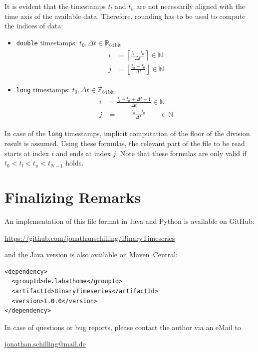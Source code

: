 \documentclass[a4paper,10pt]{article}
\begin{document}
It is evident that the timestamps $t_l$ and $t_u$ are not necessarily aligned with the time axis of the available data.
Therefore, rounding has to be used to compute the indices of data:
\begin{itemize}
  \item \texttt{double} timestamps: $t_0, \Delta t \in \mathbb{R}_\mathrm{64\,bit}$
  \begin{gather}
   \begin{align}
    i & = \left\lceil  \frac{t_l - t_0}{\Delta t} \right\rceil  \in \mathbb{N} \\
    j & = \left\lfloor \frac{t_u - t_0}{\Delta t} \right\rfloor \in \mathbb{N}
   \end{align}
  \end{gather}
  \item \texttt{long} timestamps: $t_0, \Delta t \in \mathbb{Z}_\mathrm{64\,bit}$
  \begin{gather}
   \begin{align}
    i & = \frac{t_l - t_0 + \Delta t - 1}{\Delta t} \in \mathbb{N} \\
    j & = \qquad \frac{t_u - t_0}{\Delta t} \qquad  \in \mathbb{N}
   \end{align}
  \end{gather}
\end{itemize}
In case of the \texttt{long} timestamps, implicit computation of the floor of the division result is assumed.
Using these formulas, the relevant part of the file to be read starts at index $i$ and ends at index $j$.
Note that these formulas are only valid if $t_0 < t_l < t_u < t_{N-1}$ holds.








\section{Finalizing Remarks}
An implementation of this file format in Java and Python is available on GitHub:
\begin{center}
\href{https://github.com/jonathanschilling/BinaryTimeseries}{https://github.com/jonathanschilling/BinaryTimeseries}
\end{center}
and the Java version is also available on Maven~Central:
\begin{verbatim}
<dependency>
  <groupId>de.labathome</groupId>
  <artifactId>BinaryTimeseries</artifactId>
  <version>1.0.0</version>
</dependency>
\end{verbatim}
In case of questions or bug reports, please contact the author via an eMail to
\begin{center}
\href{mailto:jonathan.schilling@mail.de}{jonathan.schilling@mail.de}
\end{center}
\end{document}
